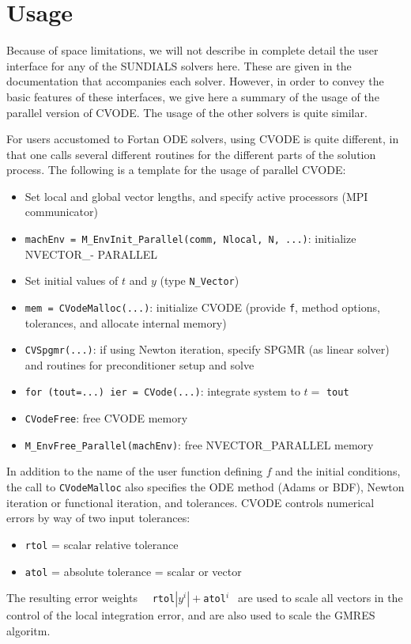 \section{Usage}

Because of space limitations, we will not describe in complete detail
the user interface for any of the SUNDIALS solvers here.  These are
given in the documentation that accompanies each solver.  However, in
order to convey the basic features of these interfaces, we give here a
summary of the usage of the parallel version of CVODE.  The usage
of the other solvers is quite similar.

For users accustomed to Fortan ODE solvers, using CVODE is quite
different, in that one calls several different routines for the
different parts of the solution process.  The following is a template
for the usage of parallel CVODE:

\begin{itemize}

\item Set local and global vector lengths, and specify active
processors (MPI communicator)

\item {\tt machEnv =  M\_EnvInit\_Parallel(comm, Nlocal, N, ...)}:
initialize NVECTOR\_- \newline PARALLEL

\item Set initial values of $t$ and $y$ (type {\tt N\_Vector})

\item {\tt mem = CVodeMalloc(...)}: initialize CVODE (provide {\tt f},
method options, tolerances, and allocate internal memory)

\item {\tt CVSpgmr(...)}: if using Newton iteration, specify SPGMR
(as linear solver) and routines for preconditioner setup and solve

\item {\tt for (tout=...) ier = CVode(...)}: integrate system to
$t =$ {\tt tout}

\item {\tt CVodeFree}: free CVODE memory

\item {\tt M\_EnvFree\_Parallel(machEnv)}: free NVECTOR\_PARALLEL memory

\end{itemize}

In addition to the name of the user function defining $f$ and the
initial conditions, the call to {\tt CVodeMalloc} also specifies the
ODE method (Adams or BDF), Newton iteration or functional iteration,
and tolerances.  CVODE controls numerical errors by way of two input
tolerances:
\vspace*{-.19in}
\begin{itemize}
\item {\tt rtol} = scalar relative tolerance
\item {\tt atol} = absolute tolerance = scalar or vector
\end{itemize}
The resulting error weights ~~{\tt rtol}$|y^i| + ${\tt atol}$^i~~$ are
used to scale all vectors in the control of the local integration
error, and are also used to scale the GMRES algoritm.

